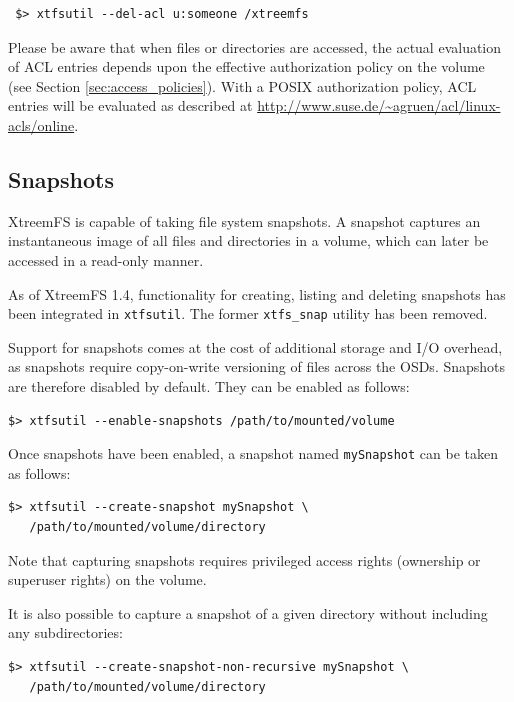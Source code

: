\documentclass[a4paper,10pt]{book}
\begin{document}
\begin{verbatim}
 $> xtfsutil --del-acl u:someone /xtreemfs
\end{verbatim}

Please be aware that when files or directories are accessed, the actual evaluation of ACL entries depends upon the effective authorization policy on the volume (see Section \ref{sec:access_policies}). With a POSIX authorization policy, ACL entries will be evaluated as described at \href{http://www.suse.de/~agruen/acl/linux-acls/online}{http://www.suse.de/\~{}agruen/acl/linux-acls/online}.

\subsection{Snapshots}

XtreemFS is capable of taking file system snapshots. A snapshot captures an instantaneous image of all files and directories in a volume, which can later be accessed in a read-only manner.

As of XtreemFS 1.4, functionality for creating, listing and deleting snapshots has been integrated in \texttt{xtfsutil}. The former \texttt{xtfs\_snap} utility has been removed.

Support for snapshots comes at the cost of additional storage and I/O overhead, as snapshots require copy-on-write versioning of files across the OSDs. Snapshots are therefore disabled by default. They can be enabled as follows:

\begin{verbatim}
$> xtfsutil --enable-snapshots /path/to/mounted/volume
\end{verbatim}

Once snapshots have been enabled, a snapshot named \texttt{mySnapshot} can be taken as follows:

\begin{verbatim}
$> xtfsutil --create-snapshot mySnapshot \
   /path/to/mounted/volume/directory 
\end{verbatim}

Note that capturing snapshots requires privileged access rights (ownership or superuser rights) on the volume.

It is also possible to capture a snapshot of a given directory without including any subdirectories:

\begin{verbatim}
$> xtfsutil --create-snapshot-non-recursive mySnapshot \
   /path/to/mounted/volume/directory
\end{verbatim}
\end{document}
